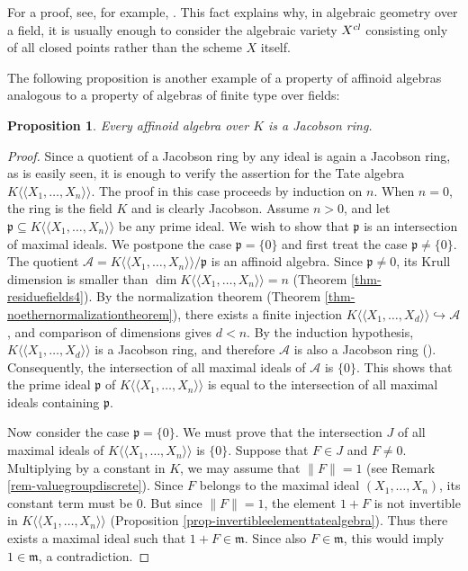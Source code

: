 \documentclass[a4paper,12pt, dvipdfmx]{jsbook}
\def\m{\mathfrak{m}}
\def\cl{\mathop{\textsl{cl}}\nolimits}
\def\dl{\langle\!\langle}
\def\dr{\rangle\!\rangle}
\newcommand{\abss}[1]{\|#1\|}
\theoremstyle{plain}
\newtheorem{prop}[thm]{\bfseries Proposition}
\theoremstyle{definition}
\begin{document}
For a proof, see, for example, \cite[Theorem 5.5]{Matsu}.
This fact explains why, in algebraic geometry over a field, it is usually enough to consider the algebraic variety $X^{\cl}$ consisting only of all closed points rather than the scheme $X$ itself.

The following proposition is another example of a property of affinoid algebras analogous to a property of algebras of finite type over fields:
\begin{prop}\label{prop-jacobsonaffinoidalgebras}{\rm 
Every affinoid algebra over $K$ is a Jacobson ring.}
\end{prop}


\begin{proof}[Proof]
Since a quotient of a Jacobson ring by any ideal is again a Jacobson ring, as is easily seen, it is enough to verify the assertion for the Tate algebra $K\dl X_1,\ldots,X_n\dr$.
The proof in this case proceeds by induction on $n$.
When $n=0$, the ring is the field $K$ and is clearly Jacobson.
Assume $n>0$, and let $\mathfrak{p}\subseteq K\dl X_1,\ldots,X_n\dr$ be any prime ideal.
We wish to show that $\mathfrak{p}$ is an intersection of maximal ideals.
We postpone the case $\mathfrak{p}=\{0\}$ and first treat the case $\mathfrak{p}\neq\{0\}$.
The quotient $\mathcal{A}=K\dl X_1,\ldots,X_n\dr/\mathfrak{p}$ is an affinoid algebra. Since $\mathfrak{p}\neq 0$, its Krull dimension is smaller than $\dim K\dl X_1,\ldots,X_n\dr=n$ (Theorem \ref{thm-residuefields4}).
By the normalization theorem (Theorem \ref{thm-noethernormalizationtheorem}), there exists a finite injection $K\dl X_1,\ldots,X_d\dr\hookrightarrow\mathcal{A}$, and comparison of dimensions gives $d<n$.
By the induction hypothesis, $K\dl X_1,\ldots,X_d\dr$ is a Jacobson ring, and therefore $\mathcal{A}$ is also a Jacobson ring (\cite[Chap.\ V, \S3.4, Prop.\ 5]{Bourb1}).
Consequently, the intersection of all maximal ideals of $\mathcal{A}$ is $\{0\}$.
This shows that the prime ideal $\mathfrak{p}$ of $K\dl X_1,\ldots,X_n\dr$ is equal to the intersection of all maximal ideals containing $\mathfrak{p}$.

Now consider the case $\mathfrak{p}=\{0\}$.
We must prove that the intersection $J$ of all maximal ideals of $K\dl X_1,\ldots,X_n\dr$ is $\{0\}$.
Suppose that $F\in J$ and $F\neq 0$.
Multiplying by a constant in $K$, we may assume that $\abss{F}=1$ (see Remark \ref{rem-valuegroupdiscrete}).
Since $F$ belongs to the maximal ideal $(X_1,\ldots,X_n)$, its constant term must be $0$.
But since $\abss{F}=1$, the element $1+F$ is not invertible in $K\dl X_1,\ldots,X_n\dr$ (Proposition \ref{prop-invertibleelementtatealgebra}).
Thus there exists a maximal ideal such that $1+F\in\m$. Since also $F\in\m$, this would imply $1\in\m$, a contradiction.
\end{proof}
\end{document}
